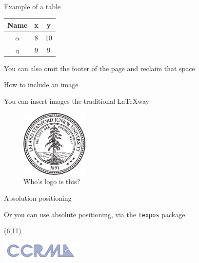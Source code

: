 \documentclass{beamer}
\begin{document}
\begin{frame}[plain]{Example of a table}

    \vspace{3cm}

    \begin{center}
        \begin{tabular}{c c c}
        \bf Name & \bf x & \bf y \\
        \hline
        $\alpha$ & 8 & 10 \\
        $\eta$ & 9 & 9 \\
        \hline
        \end{tabular}
    \end{center}

    \vspace{3cm}

    \begin{center}
    \scriptsize
    You can also omit the footer of the page and reclaim that space
    \end{center}

\end{frame}

\begin{frame}{How to include an image}

    You can insert images the traditional \LaTeX way

    \begin{figure}
        \includegraphics[width=0.3\textwidth]{stanford-logo.pdf}
        \caption{Who's logo is this?}
    \end{figure}
\end{frame}


\begin{frame}{Absolution positioning}

    Or you can use absolute positioning, via the \texttt{texpos} package



    \begin{textblock}{20}(6,11)
    \begin{rotate}{33}
      \includegraphics[width=0.3\textwidth]{ccrma-logo.pdf}
    \end{rotate}
    \end{textblock}


\end{frame}
\end{document}
